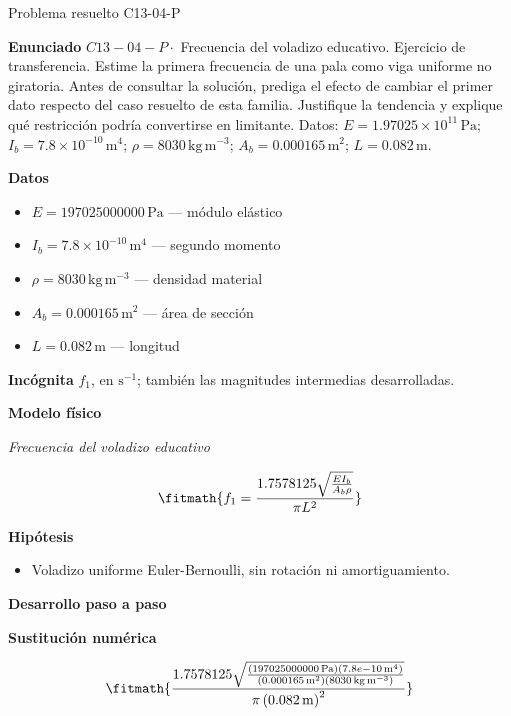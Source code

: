 \documentclass[10pt,openany]{book}
\begin{document}
\begin{studiumworked}{Problema resuelto C13-04-P}


\noindent\textbf{Enunciado}
\(C13-04-P \cdot\) Frecuencia del voladizo educativo. Ejercicio de transferencia. Estime la primera frecuencia de una pala como viga uniforme no giratoria. Antes de consultar la solución, prediga el efecto de cambiar el primer dato respecto del caso resuelto de esta familia. Justifique la tendencia y explique qué restricción podría convertirse en limitante. Datos: \(E=1.97025\times 10^{11}\, \mathrm{Pa}\); \(I_b=7.8\times 10^{-10}\, \mathrm{m}^{4}\); \(\rho=8030\, \mathrm{kg}\,\mathrm{m}^{-3}\); \(A_b=0.000165\, \mathrm{m}^{2}\); \(L=0.082\, \mathrm{m}\).

\noindent\textbf{Datos}
\begin{itemize}
\item $E = 197025000000\,\mathrm{Pa}$ — módulo elástico
\item $I_b = 7.8\times 10^{-10}\,\mathrm{m}^{4}$ — segundo momento
\item $\rho = 8030\,\mathrm{kg}\,\mathrm{m}^{-3}$ — densidad material
\item $A_b = 0.000165\,\mathrm{m}^{2}$ — área de sección
\item $L = 0.082\,\mathrm{m}$ — longitud
\end{itemize}

\noindent\textbf{Incógnita}
$f_1$, en $\mathrm{s^{-1}}$; también las magnitudes intermedias desarrolladas.

\noindent\textbf{Modelo físico}

\noindent\textit{Frecuencia del voladizo educativo}

\[
\fitmath{f_1=\frac{1.7578125 \sqrt{\frac{E I_b}{A_b \rho}}}{\pi L^{2}}}
\]

\noindent\textbf{Hipótesis}
\begin{itemize}
\item Voladizo uniforme Euler-Bernoulli, sin rotación ni amortiguamiento.
\end{itemize}

\noindent\textbf{Desarrollo paso a paso}



\noindent\textbf{Sustitución numérica}

\[
\fitmath{\frac{1.7578125 \sqrt{\frac{\left(197025000000\,\mathrm{Pa}\right) \left(7.8e-10\,\mathrm{m}^{4}\right)}{\left(0.000165\,\mathrm{m}^{2}\right) \left(8030\,\mathrm{kg}\,\mathrm{m}^{-3}\right)}}}{\pi \left(0.082\,\mathrm{m}\right)^{2}}}
\]


\end{studiumworked}
\end{document}
